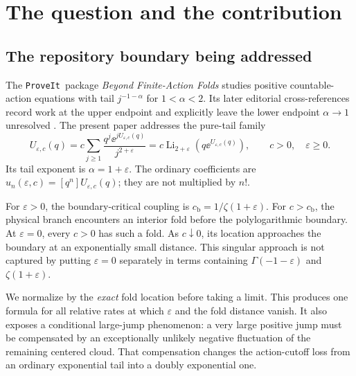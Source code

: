 \documentclass[11pt,a4paper]{article}
\numberwithin{equation}{section}
\theoremstyle{definition}
\theoremstyle{remark}
\DeclareMathOperator{\Li}{Li}
\newcommand{\ep}{\varepsilon}\newcommand{\la}{\lambda}
\newcommand{\coef}[1]{[#1]}
\newcommand{\repo}{\texttt{ProveIt}}
\begin{document}
\section{The question and the contribution}
\label{sec:intro}

\subsection{The repository boundary being addressed}
The \repo\ package \emph{Beyond Finite-Action Folds} studies positive
countable-action equations with tail \(j^{-1-\alpha}\) for
\(1<\alpha<2\). Its later editorial cross-references record work at the
upper endpoint and explicitly leave the lower endpoint \(\alpha\to1\)
unresolved \cite{repo-critical,repo-index}. The present paper addresses the pure-tail
family
\begin{equation}\label{eq:model}
 U_{\ep,c}(q)=c\sum_{j\ge1}\frac{q^j\ee^{jU_{\ep,c}(q)}}{j^{2+\ep}}
             =c\Li_{2+\ep}(q\ee^{U_{\ep,c}(q)}),
 \qquad c>0,\quad \ep\ge0.
\end{equation}
Its tail exponent is \(\alpha=1+\ep\). The ordinary coefficients are
\(u_n(\ep,c)=\coef{q^n}U_{\ep,c}(q)\); they are not multiplied by \(n!\).

For \(\ep>0\), the boundary-critical coupling is
\(c_{\mathrm b}=1/\zeta(1+\ep)\). For \(c>c_{\mathrm b}\), the physical
branch encounters an interior fold before the polylogarithmic boundary.
At \(\ep=0\), every \(c>0\) has such a fold. As \(c\downarrow0\), its
location approaches the boundary at an exponentially small distance.
This singular approach is not captured by putting \(\ep=0\) separately
in terms containing \(\Gamma(-1-\ep)\) and \(\zeta(1+\ep)\).

We normalize by the \emph{exact} fold location before taking a limit. This
produces one formula for all relative rates at which \(\ep\) and the fold
distance vanish. It also exposes a conditional large-jump phenomenon:
a very large positive jump must be compensated by an exceptionally
unlikely negative fluctuation of the remaining centered cloud.
That compensation changes the action-cutoff loss from an ordinary
exponential tail into a doubly exponential one.
\end{document}
